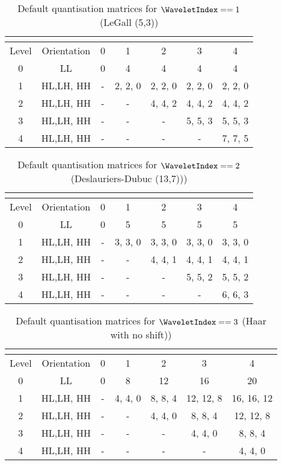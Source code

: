 \begin{table}[!ht]
\centering
\begin{tabular}{|c|c|c|c|c|c|c|}
\hline
\multicolumn{2}{|c|}{\cellcolor[gray]{0.75}}& \multicolumn{5}{|c|}{\cellcolor[gray]{0.75}{$\TransformDepth$}} \\
\hline
Level & Orientation & 0 & 1 & 2 & 3 & 4 \\
\hline
0 & LL & 0 & 4 & 4 & 4 & 4\\
\hline
1 & HL,LH, HH & - & 2, 2, 0 & 2, 2, 0 & 2, 2, 0 & 2, 2, 0  \\
\hline
2 & HL,LH, HH & - & - & 4, 4, 2 & 4, 4, 2 & 4, 4, 2  \\
\hline
3 & HL,LH, HH & - & - & - & 5, 5, 3 & 5, 5, 3  \\
\hline
4 & HL,LH, HH & - & - & - & - & 7, 7, 5  \\
\hline
\end{tabular}
\caption{Default quantisation matrices for $\WaveletIndex==1$ (LeGall (5,3)) 
\label{table:qm1}}
\end{table}

\begin{table}[!ht]
\centering
\begin{tabular}{|c|c|c|c|c|c|c|}
\hline
\multicolumn{2}{|c|}{\cellcolor[gray]{0.75}}& \multicolumn{5}{|c|}{\cellcolor[gray]{0.75}{$\TransformDepth$}} \\
\hline
Level & Orientation & 0 & 1 & 2 & 3 & 4 \\
\hline
0 & LL & 0 & 5 & 5 & 5 & 5\\
\hline
1 & HL,LH, HH & - & 3, 3, 0 & 3, 3, 0 & 3, 3, 0 & 3, 3, 0  \\
\hline
2 & HL,LH, HH & - & - & 4, 4, 1 & 4, 4, 1 & 4, 4, 1  \\
\hline
3 & HL,LH, HH & - & - & - & 5, 5, 2 & 5, 5, 2  \\
\hline
4 & HL,LH, HH & - & - & - & - & 6, 6, 3  \\
\hline
\end{tabular}
\caption{Default quantisation matrices for $\WaveletIndex==2$ (Deslauriers-Dubuc (13,7))) 
\label{table:qm2}}
\end{table}

\begin{table}[!ht]
\centering
\begin{tabular}{|c|c|c|c|c|c|c|}
\hline
\multicolumn{2}{|c|}{\cellcolor[gray]{0.75}}& \multicolumn{5}{|c|}{\cellcolor[gray]{0.75}{$\TransformDepth$}} \\
\hline
Level & Orientation & 0 & 1 & 2 & 3 & 4 \\
\hline
0 & LL & 0 & 8 & 12 & 16 & 20\\
\hline
1 & HL,LH, HH & - & 4, 4, 0 & 8, 8, 4 & 12, 12, 8 & 16, 16, 12  \\
\hline
2 & HL,LH, HH & - & - & 4, 4, 0 & 8, 8, 4 & 12, 12, 8  \\
\hline
3 & HL,LH, HH & - & - & - & 4, 4, 0 & 8, 8, 4  \\
\hline
4 & HL,LH, HH & - & - & - & - & 4, 4, 0  \\
\hline
\end{tabular}
\caption{Default quantisation matrices for $\WaveletIndex==3$ (Haar with no shift)) 
\label{table:qm3}}
\end{table}

